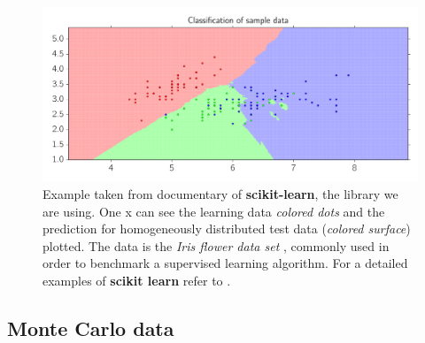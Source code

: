 \begin{figure}[htpb]
    \centering
    \includegraphics[width=1\linewidth]{figures/kneigbors}
    \caption{Example taken from documentary of \textbf{scikit-learn}\cite{scikit-learn}, the library we are using. One x can
    see the learning data \textit{colored dots} and the prediction for homogeneously distributed test data
    (\textit{colored surface}) plotted. The data is the \textit{Iris flower data set} \cite{frank1968numerical}, commonly used 
    in order to benchmark a supervised learning algorithm. For a detailed examples of \textbf{scikit learn}
    refer to \cite{masteringscikit}.}
\label{fig:kneigbors}
\end{figure}

\clearpage
\subsection{Monte Carlo data}

